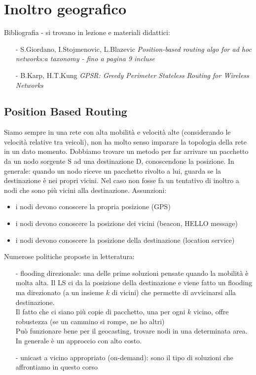 \documentclass[12pt,italian]{report}
\begin{document}
\chapter{Inoltro geografico}
Bibliografia - si trovano in lezione e materiali didattici: 
\begin{itemize}
    \item[-]S.Giordano, I.Stojmenovic, L.Blazevic 
    \textit{Position-based routing algo for ad hoc networks:a taxonomy - fino a pagina 9 incluse}
    \item[-] B.Karp, H.T.Kung
    \textit{GPSR: Greedy Perimeter Stateless Routing for Wireless Networks}
\end{itemize}

\section{Position Based Routing}
Siamo sempre in una rete con alta mobilità e velocità alte (considerando le velocità relative tra veicoli), non ha molto senso imparare la topologia della rete in un dato momento. Dobbiamo trovare un metodo per far arrivare un pacchetto da un nodo sorgente S ad una destinazione D, conoscendone la posizione. 
\bigbreak
In generale: quando un nodo riceve un pacchetto rivolto a lui, guarda se la destinazione è nei propri vicini. Nel caso non fosse fa un tentativo di inoltro a nodi che sono più vicini alla destinazione.
\bigbreak
\noindent Assunzioni:
\begin{itemize}
    \item i nodi devono conoscere la propria posizione (GPS)
    \item i nodi devono conoscere la posizione dei vicini (beacon, HELLO message)
    \item i nodi devono conoscere la posizione della destinazione (location service)
\end{itemize}
\bigbreak
\noindent Numerose politiche proposte in letteratura:
\begin{itemize}
    \item [-] flooding direzionale: una delle prime soluzioni pensate quando la mobilità è molta alta. Il LS ci da la posizione della destinazione e viene fatto un flooding ma direzionato (a un insieme $k$ di vicini) che permette di avvicinarsi alla destinazione. \\ Il fatto che ci siano più copie di pacchetto, una per ogni $k$ vicino, offre robustezza (se un cammino si rompe, ne ho altri) \\ Può funzionare bene per il geocasting, trovare nodi in una determinata area. \\ In generale è un approccio con alto costo. 
    \item [-] unicast a vicino appropriato (on-demand): sono il tipo di soluzioni che affrontiamo in questo corso
\end{itemize}
\end{document}
